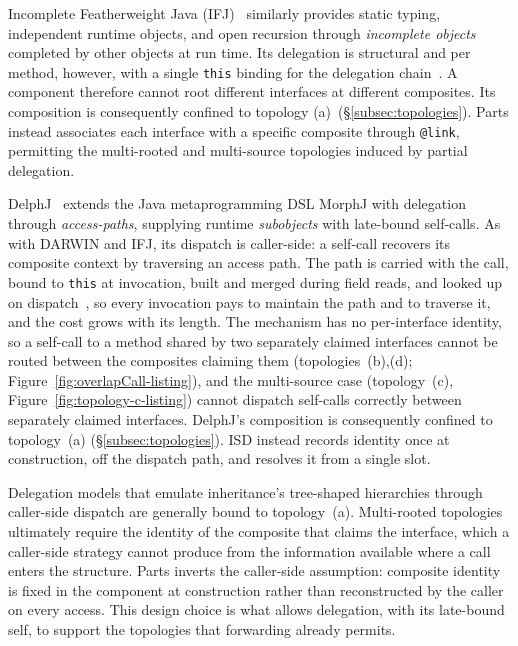 \documentclass[acmsmall,screen,review,anonymous]{acmart}
\theoremstyle{acmplain}
\newcommand{\code}[1]{\texttt{#1}}
\begin{document}
Incomplete Featherweight Java (IFJ)~\cite{bettini2011} similarly provides
static typing, independent runtime objects, and open recursion through
\emph{incomplete objects} completed by other objects at run time. Its
delegation is structural and per method, however, with a single \code{this}
binding for the delegation chain~\cite[\S1, Fig.~1]{bettini2011}. A component
therefore cannot root different interfaces at different composites. Its
composition is consequently confined to topology (a)~(\S\ref{subsec:topologies}).
Parts instead associates each interface with a specific composite through
\code{@link}, permitting the multi-rooted and multi-source topologies induced
by partial delegation.

DelphJ~\cite{gerakios2013} extends the Java metaprogramming DSL MorphJ with
delegation through \emph{access-paths}, supplying runtime \emph{subobjects} with
late-bound self-calls. As with DARWIN and IFJ, its dispatch is caller-side: a
self-call recovers its composite context by traversing an access path. The path
is carried with the call, bound to \code{this} at invocation, built and merged
during field reads, and looked up on dispatch~\cite[\S3]{gerakios2013}, so every
invocation pays to maintain the path and to traverse it, and the cost grows with
its length. The mechanism has no per-interface identity, so a self-call to a
method shared by two separately claimed interfaces cannot be routed between the
composites claiming them (topologies~(b),(d); Figure~\ref{fig:overlapCall-listing}),
and the multi-source case (topology~(c), Figure~\ref{fig:topology-c-listing})
cannot dispatch self-calls correctly between separately claimed interfaces.
DelphJ's composition is consequently confined to topology~(a) (\S\ref{subsec:topologies}).
ISD instead records identity once at construction, off the dispatch path, and
resolves it from a single slot.

Delegation models that emulate inheritance's tree-shaped hierarchies through caller-side dispatch are generally bound to
topology~(a). Multi-rooted topologies ultimately require the identity of the composite that claims the interface,
which a caller-side strategy cannot produce from the information available where a call enters the structure. Parts inverts
the caller-side assumption: composite identity is fixed in the component at construction rather than reconstructed by the
caller on every access. This design choice is what allows delegation, with its late-bound self, to support the topologies
that forwarding already permits.
\end{document}
